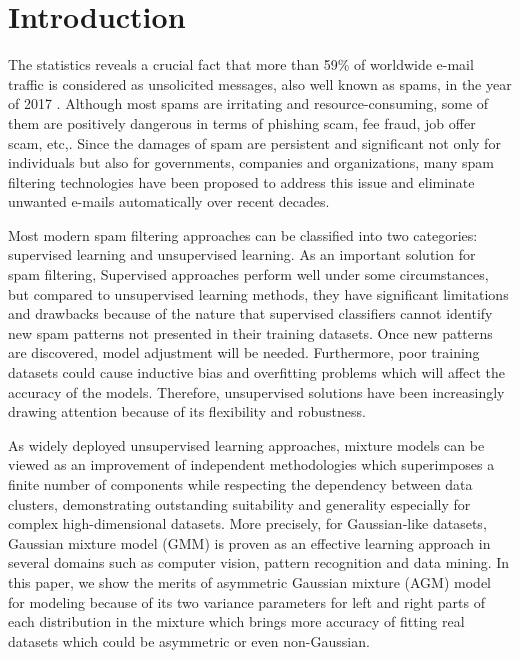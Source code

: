 \documentclass[conference]{IEEEtran}
\begin{document}
\section{Introduction}
The statistics reveals a crucial fact that more than 59\% of worldwide e-mail traffic is considered as unsolicited messages, also well known as spams, in the year of 2017 \cite{spamStats}. Although most spams are irritating and resource-consuming, some of them are positively dangerous in terms of phishing scam, fee fraud, job offer scam, etc,. Since the damages of spam are persistent and significant not only for individuals but also for governments, companies and organizations, many spam filtering technologies have been proposed to address this issue and eliminate unwanted e-mails automatically over recent decades. 

Most modern spam filtering approaches can be classified into two categories: supervised learning and unsupervised learning. As an important solution for spam filtering, Supervised approaches\cite{supervisedSpam} perform well under some circumstances, but compared to unsupervised learning methods, they have significant limitations and drawbacks because of the nature that supervised classifiers cannot identify new spam patterns not presented in their training datasets. Once new patterns are discovered, model adjustment will be needed. Furthermore, poor training datasets could cause inductive bias and overfitting problems which will affect the accuracy of the models. Therefore, unsupervised solutions have been increasingly drawing attention because of its flexibility and robustness.

As widely deployed unsupervised learning approaches, mixture models can be viewed as an improvement of independent methodologies which superimposes a finite number of components while respecting the dependency between data clusters, demonstrating outstanding suitability and generality especially for complex high-dimensional datasets. More precisely, for Gaussian-like datasets, Gaussian mixture model (GMM) \cite{b1} is proven as an effective   learning approach in several domains such as computer vision, pattern recognition and data mining. In this paper, we show the merits of asymmetric Gaussian mixture (AGM) model \cite{b2} for modeling because of its two variance parameters for left and right parts of each distribution in the mixture which brings more accuracy of fitting real datasets which could be asymmetric or even non-Gaussian. 
\end{document}
